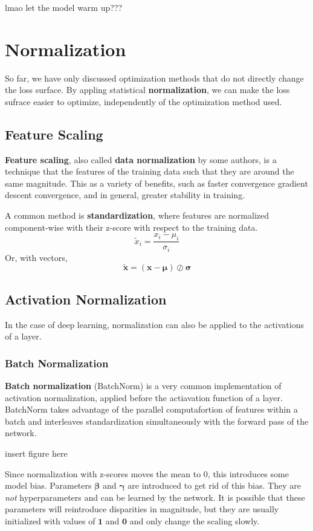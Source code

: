 \documentclass[12pt]{report}
\theoremstyle{definition}
\theoremstyle{remark}
\begin{document}
lmao let the model warm up???

\section{Normalization}
So far, we have only discussed optimization methods that do not directly change the loss surface. By appling statistical \textbf{normalization}, we can make the loss sufrace easier to optimize, independently of the optimization method used.

\subsection{Feature Scaling}
\textbf{Feature scaling}, also called \textbf{data normalization} by some authors, is a technique that the features of the training data such that they are around the same magnitude. This as a variety of benefits, such as faster convergence gradient descent convergence, and in general, greater stability in training.

A common method is \textbf{standardization}, where features are normalized component-wise with their z-score with respect to the training data.
\begin{equation}
    \tilde{x}_i = \frac{x_i - \mu_i}{\sigma_i}
\end{equation}
Or, with vectors,
\begin{equation}
    \tilde{\mathbf{x}} = (\mathbf{x} - \boldsymbol{\mu}) \oslash \boldsymbol{\sigma}
\end{equation}

\subsection{Activation Normalization}
In the case of deep learning, normalization can also be applied to the activations of a layer.

\subsubsection{Batch Normalization}
\textbf{Batch normalization} (BatchNorm) is a very common implementation of activation normalization, applied before the actiavation function of a layer. BatchNorm takes advantage of the parallel computafortion of features within a batch and interleaves standardization simultaneously with the forward pass of the network.

insert figure here

Since normalization with z-scores moves the mean to $0$, this introduces some model bias. Parameters $\boldsymbol{\beta}$ and $\boldsymbol{\gamma}$ are introduced to get rid of this bias. They are \textit{not} hyperparameters and can be learned by the network. It is possible that these parameters will reintroduce disparities in magnitude, but they are usually initialized with values of $\mathbf{1}$ and $\mathbf{0}$ and only change the scaling slowly.
\end{document}
